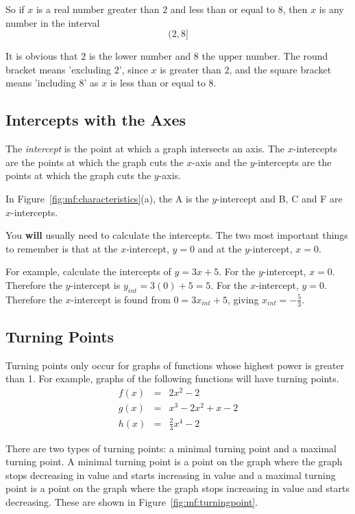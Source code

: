 \documentclass[10pt,a4paper,titlepage,twoside,openright]{report}
\begin{document}
So if $x$ is a real number greater than $2$ and less than or equal to $8$, then $x$ is any number in the interval
\begin{equation}
(2,8]
\end{equation}

It is obvious that $2$ is the lower number and $8$ the upper number. The round bracket means 'excluding $2$', since $x$ is greater than $2$, and the square bracket means 'including $8$' as $x$ is less than or equal to $8$.

\subsection{Intercepts with the Axes}
The \textit{intercept} is the point at which a graph intersects an axis. The $x$-intercepts are the points at which the graph cuts the $x$-axis and the $y$-intercepts are the points at which the graph cuts the $y$-axis.

In Figure~\ref{fig:mf:characteristics}(a), the A is the $y$-intercept and B, C and F are $x$-intercepts.

You \textbf{will} usually need to calculate the intercepts. The two most important things to remember is that at the $x$-intercept, $y=0$ and at the $y$-intercept, $x=0$.

For example, calculate the intercepts of $y=3x+5$. For the $y$-intercept, $x=0$. Therefore the $y$-intercept is $y_{int}=3(0)+5=5$. For the $x$-intercept, $y=0$. Therefore the $x$-intercept is found from $0=3x_{int}+5$, giving $x_{int}=-\frac{5}{3}$.

\subsection{Turning Points}
Turning points only occur for graphs of functions whose highest power is greater than 1. For example, graphs of the following functions will have turning points.
\begin{eqnarray*}
f(x)&=&2x^2-2\\
g(x)&=&x^3-2x^2+x-2\\
h(x)&=&\frac{2}{3}x^4-2
\end{eqnarray*}

There are two types of turning points: a minimal turning point and a maximal turning point. A minimal turning point is a point on the graph where the graph stops decreasing in value and starts increasing in value and a maximal turning point is a point on the graph where the graph stops increasing in value and starts decreasing. These are shown in Figure~\ref{fig:mf:turningpoint}.
\end{document}
